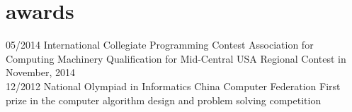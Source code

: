 \documentclass{friggeri-cv} %
\begin{document}
\section{awards}

\begin{entrylist}
\entry
{05/2014}
{International Collegiate Programming Contest}
{Association for Computing Machinery}
{Qualification for Mid-Central USA Regional Contest in November, 2014\\}
\entry
{12/2012}
{National Olympiad in Informatics}
{China Computer Federation}
{First prize in the computer algorithm design and problem solving competition\\}
\end{entrylist}
\end{document}
